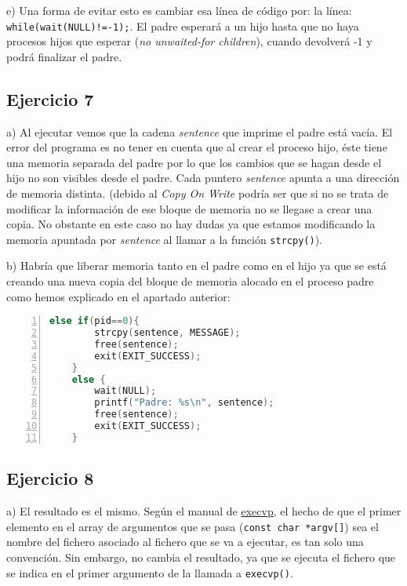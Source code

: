 \documentclass{article}
\begin{document}
e) Una forma de evitar esto es cambiar esa línea de código por: la línea: \texttt{while(wait(NULL)!=-1);}. El padre esperará a un hijo hasta que no haya procesos hijos que esperar (\textit{no unwaited-for children}), cuando devolverá -1 y podrá finalizar el padre.  

\subsection*{Ejercicio 7}

a) Al ejecutar vemos que la cadena \textit{sentence} que imprime el padre está vacía. El error del programa es no tener en cuenta que al crear el proceso hijo, éste tiene una memoria separada del padre  por lo que los cambios que se hagan desde el hijo no son visibles desde el padre. Cada puntero \textit{sentence} apunta a una dirección de memoria distinta.
(debido al \textit{Copy On Write} podría ser que si no se trata de modificar la información de ese bloque de memoria no se llegase a crear una copia. No obstante en este caso no hay dudas ya que estamos modificando la memoria apuntada por \textit{sentence} al llamar a la función \texttt{strcpy()}).

b) Habría que liberar memoria tanto en el padre como en el hijo ya que se está creando una nueva copia del bloque de memoria alocado en el proceso padre como hemos explicado en el apartado anterior:

\begin{lstlisting}[language=C, numbers=left]
    else if(pid==0){
        strcpy(sentence, MESSAGE);
        free(sentence);
        exit(EXIT_SUCCESS);
    }
    else {
        wait(NULL);
        printf("Padre: %s\n", sentence);
        free(sentence);
        exit(EXIT_SUCCESS);
    }
\end{lstlisting}



\subsection*{Ejercicio 8}

a) El resultado es el mismo. Según el manual de \href{man:execvp(3)}{execvp}, el hecho de que el primer elemento en el array de argumentos que se pasa (\texttt{const char *argv[]}) sea el nombre del fichero asociado al fichero que se va a ejecutar, es tan solo una convención. Sin embargo, no cambia el resultado, ya que se ejecuta el fichero que se indica en el primer argumento de la llamada a \texttt{execvp()}.
\end{document}

